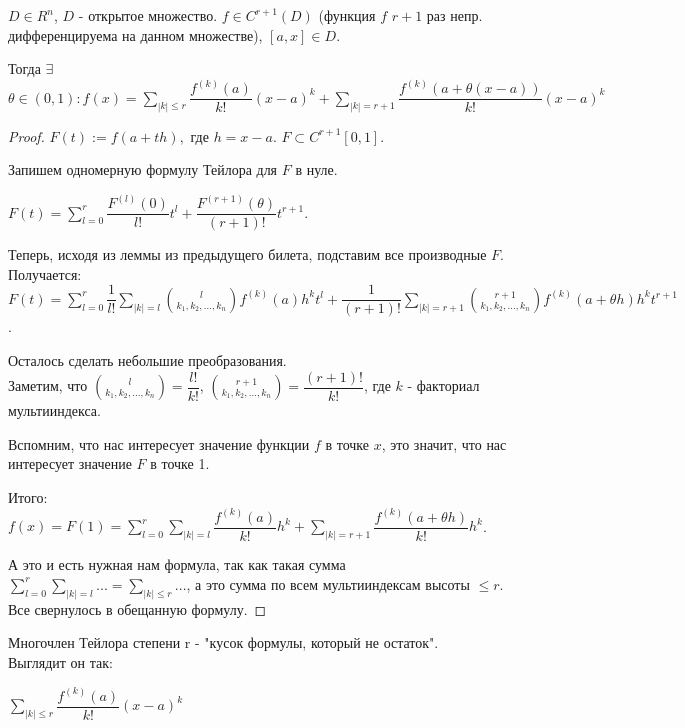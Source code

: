 
\begin{theorem} \thmslashn
	
	$D \in R^n$, $D$ - открытое множество. $f \in C^{r+1}(D)$ (функция $f$ $r + 1$ раз непр. дифференцируема на данном множестве), $[a, x] \in D$.
	
	Тогда $\exists$ $ \theta \in (0, 1) : f(x) = \sum\limits_{|k| \leq r}\dfrac{f^{(k)}(a)}{k!}(x - a)^k + \sum\limits_{|k| = r + 1}\dfrac{f^{(k)}(a + \theta(x - a))}{k!}(x - a)^k$
	
	\begin{proof} \thmslashn
		
		$F(t) := f(a + th),$ где $h = x - a$. $F \subset C^{r + 1}[0, 1]$.
		
		Запишем одномерную формулу Тейлора для $F$ в нуле.
		
		$F(t) = \sum\limits_{l = 0}^r \dfrac{F^{(l)}(0)}{l!}t^l + \dfrac{F^{(r + 1)}(\theta)}{(r + 1)!}t^{r + 1}$.
		
		Теперь, исходя из леммы из предыдущего билета, подставим все производные $F$. 
		\\Получается: $F(t) = \sum\limits_{l = 0}^r\dfrac{1}{l!} \sum\limits_{|k| = l} {l\choose{k_1, k_2, ...,k_n}} f^{(k)}(a)h^kt^l + \dfrac{1}{(r + 1)!} \sum\limits_{|k| = r + 1} {{r + 1}\choose{k_1, k_2, ..., k_n}}f^{(k)}(a + \theta h)h^k t^{r + 1}$.
		
		Осталось сделать небольшие преобразования. \\ Заметим,  что ${l\choose{k_1, k_2, ..., k_n}} = \dfrac{l!}{k!}$, ${{r + 1}\choose{k_1, k_2, ..., k_n}} = \dfrac{(r + 1)!}{k!}$, где $k$ - факториал мультииндекса.
		
		Вспомним, что нас интересует значение функции $f$ в точке $x$, это значит, что нас интересует значение $F$ в точке 1.
		
		Итого: $f(x) = F(1) = \sum\limits_{l = 0}^{r} \sum\limits_{|k| = l} \dfrac{f^{(k)}(a)}{k!}h^k + \sum\limits_{|k| = r + 1} \dfrac{f^{(k)}(a + \theta h)}{k!} h^k$.
		
		А это и есть нужная нам формула, так как такая сумма $\sum\limits_{l = 0}^{r} \sum\limits_{|k| = l} ... = \sum\limits_{|k| \leq r} ... $, а это сумма по всем мультииндексам высоты $\leq r$. Все свернулось в обещанную формулу.
	\end{proof}
\end{theorem}
\begin{example} \thmslashn
	
	Многочлен Тейлора степени r - "кусок формулы, который не остаток". \\ Выглядит он так:
	
	$\sum\limits_{|k| \leq r} \dfrac{f^{(k)}(a)}{k!}(x - a)^k$
	
\end{example}

